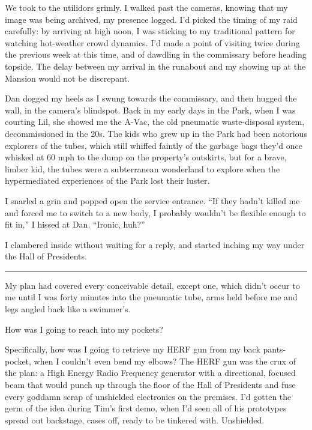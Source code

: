 We took to the utilidors grimly. I walked past the cameras, knowing
that my image was being archived, my presence logged. I'd picked
the timing of my raid carefully: by arriving at high noon, I was
sticking to my traditional pattern for watching hot-weather crowd
dynamics. I'd made a point of visiting twice during the previous
week at this time, and of dawdling in the commissary before heading
topside. The delay between my arrival in the runabout and my
showing up at the Mansion would not be discrepant.

Dan dogged my heels as I swung towards the commissary, and then
hugged the wall, in the camera's blindspot. Back in my early days
in the Park, when I was courting Lil, she showed me the A-Vac, the
old pneumatic waste-disposal system, decommissioned in the 20s. The
kids who grew up in the Park had been notorious explorers of the
tubes, which still whiffed faintly of the garbage bags they'd once
whisked at 60 mph to the dump on the property's outskirts, but for
a brave, limber kid, the tubes were a subterranean wonderland to
explore when the hypermediated experiences of the Park lost their
luster.

I snarled a grin and popped open the service entrance. “If they
hadn't killed me and forced me to switch to a new body, I probably
wouldn't be flexible enough to fit in,” I hissed at Dan. “Ironic,
huh?”

I clambered inside without waiting for a reply, and started inching
my way under the Hall of Presidents.

\begin{center}\rule{3in}{0.4pt}\end{center}

My plan had covered every conceivable detail, except one, which
didn't occur to me until I was forty minutes into the pneumatic
tube, arms held before me and legs angled back like a swimmer's.

How was I going to reach into my pockets?

Specifically, how was I going to retrieve my HERF gun from my back
pants-pocket, when I couldn't even bend my elbows? The HERF gun was
the crux of the plan: a High Energy Radio Frequency generator with
a directional, focused beam that would punch up through the floor
of the Hall of Presidents and fuse every goddamn scrap of
unshielded electronics on the premises. I'd gotten the germ of the
idea during Tim's first demo, when I'd seen all of his prototypes
spread out backstage, cases off, ready to be tinkered with.
Unshielded.

